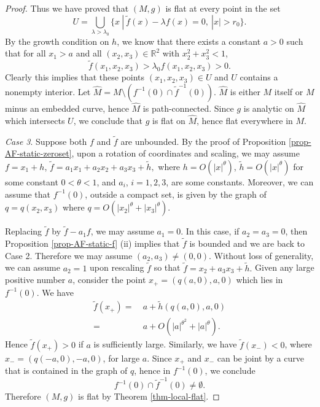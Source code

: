 \documentclass[12pt]{amsart}
\theoremstyle{remark}
\numberwithin{equation}{section}
\newcommand{\R}{\mathbb R}
\newcommand{\be}{\begin{equation}}
\newcommand{\ee}{\end{equation}}
\def\tf{\tilde{f}}
\def\th{\tilde{h}}
\def\tf{\tilde{f}}
\begin{document}
\begin{proof}
Thus we have proved that $(M, g)$ is flat at every point in the set
$$
U=\bigcup_{\lambda>\lambda_0} \{ x \ | \ \tf(x)-\lambda f(x)=0, \ |x|>r_0\}.
$$
By the growth condition on $h$, we know that there exists  a constant $a>0$ such that
for all $x_1>a$ and all $(x_2, x_3) \in \R^2$ with $ x_2^2  + x_3^2 < 1 $, $$
{\tf(x_1,x_2,x_3)}>\lambda_0 {f(x_1,x_2,x_3)} > 0 .
$$
Clearly this implies that these points $(x_1,x_2,x_3)\in U$  and $U$ contains a nonempty interior.
Let $ \hat{M} = M \setminus ( f^{-1} (0) \cap \tilde{f}^{-1} (0) ) $. $ \hat{M}$ is either $M$ itself
or $ M$ minus an embedded curve, hence
$\hat{M}$ is  path-connected. Since $g$ is analytic on $\hat{M}$ which intersects $U$,
we conclude that $g$ is flat on $\hat{M}$,
hence flat everywhere in $M$.

 {\it Case 3}.
 Suppose both $ f$ and $ \tf$ are unbounded. By the proof of Proposition \ref{prop-AF-static-zeroset},
 upon a rotation of coordinates and scaling, we may assume
$  f  =   x_1  + h $,
$ \tf = a_1 x_1 + a_2 x_2 + a_3 x_3 + \th, $
where   $ h =O(|x|^{\theta})$, $\th =O(|x|^{\theta})$  for some constant $ 0 < \theta < 1$,
 and $ a_i$, $ i = 1, 2, 3$, are some  constants. Moreover, we can assume that
 $f^{-1}(0)$, outside a compact set,  is given by the graph of
$ q = q (x_2, x_3) $ where $ q = O ( | x_2 |^\theta + |x_3|^{\theta}) $.


Replacing $\tf$ by $\tf-a_1f$, we may assume $a_1=0$.
In this case, if $ a_2 = a_3 = 0 $, then Proposition \ref{prop-AF-static-f} (ii) implies
that $\tf$ is bounded and we are back to Case 2.
Therefore we may assume $(a_2, a_3) \neq (0, 0)$.
Without loss of generality, we can  assume  $a_2=1$ upon rescaling $\tf$
so that
$\tf =   x_2 + a_3 x_3 + \th.$
Given any large positive number $ a$, consider the point $ x_+ = ( q(a, 0), a, 0)$ which lies in $ f^{-1} (0)$.
We have
\be
\begin{split}
 \tf (x_+) = & \ a + \th (q(a,0), a, 0) \\
          = & \ a + O ( | a |^{\theta^2} + | a|^\theta ) .
 \end{split}
 \ee
Hence $ \tf (x_+) > 0 $ if $a $ is sufficiently large.  Similarly, we have $ \tf (x_-) < 0 $, where $ x_- = ( q( - a , 0) , - a, 0 )$,
for large $a$. Since $ x_+ $ and $ x_-$ can be joint by a curve that is contained in the graph of $q$, hence in $f^{-1}(0)$, we
conclude
$$ f^{-1} (0) \cap \tilde{f}^{-1} (0) \neq \emptyset .$$
Therefore $(M, g)$ is flat  by Theorem \ref{thm-local-flat}.
\end{proof}
\end{document}
